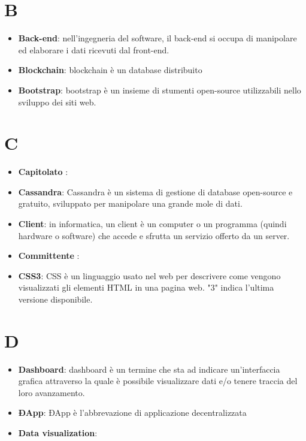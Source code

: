 \documentclass[a4paper, oneside, openany]{article}
\begin{document}
\copertina{}
\tableofcontents
\newpage
\section{B}
\begin{itemize}
\item \textbf{Back-end}: nell'ingegneria del software, il back-end si occupa di manipolare ed elaborare i dati ricevuti dal front-end.	
\item \textbf{Blockchain}: blockchain è un database distribuito 
\item \textbf{Bootstrap}: bootstrap è un insieme di stumenti open-source utilizzabili nello sviluppo dei siti web.  
\end{itemize}

\section{C}
\begin{itemize}
\item \textbf{Capitolato \color{red}{serve davvero?}}: 
\item \textbf{Cassandra}: Cassandra è un sistema di gestione di database  open-source e gratuito, sviluppato per manipolare una grande mole di dati.
\item \textbf{Client}: in informatica, un client è un computer o un programma (quindi hardware o software) che accede e sfrutta un servizio offerto da un server.
\item \textbf{Committente \color{red}{serve davvero?}}: 
\item \textbf{CSS3}: CSS è un linguaggio usato nel web per descrivere come vengono visualizzati gli elementi HTML in una pagina web. "3" indica l'ultima versione disponibile.
\end{itemize}


\section{D}
\begin{itemize}
\item \textbf{Dashboard}: dashboard è un termine che sta ad indicare un'interfaccia grafica attraverso la quale è possibile visualizzare dati e/o tenere traccia del loro avanzamento.
\item \textbf{ÐApp}: ÐApp è l'abbrevazione di applicazione decentralizzata
\item \textbf{Data visualization}:
\end{itemize}
\end{document}
